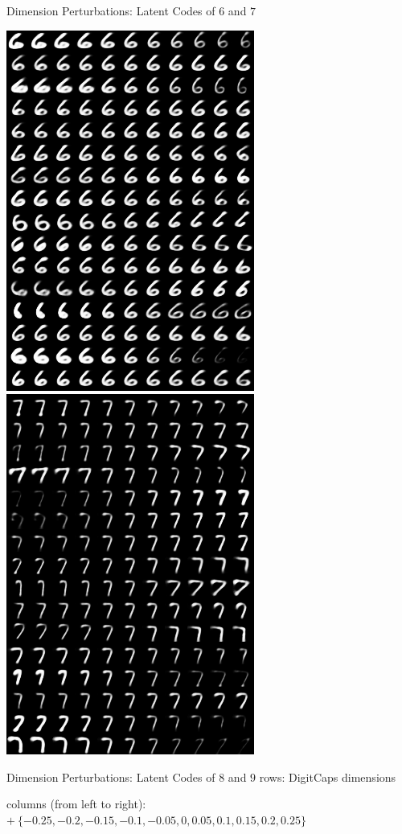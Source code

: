 \documentclass{beamer}
\begin{document}
{\begin{frame}{Dimension Perturbations: Latent Codes of $6$ and $7$}
      \begin{center}
        \includegraphics[width=.4\textwidth]{../img/recons-capsnet-keras/manipulate-6.png}
        \includegraphics[width=.4\textwidth]{../img/recons-capsnet-keras/manipulate-7.png}
      \end{center}
    \end{frame}

    \begin{frame}{Dimension Perturbations: Latent Codes of $8$ and $9$}
      \tiny
      rows: DigitCaps dimensions

      columns (from left to right): $+ \  \{ -0.25, -0.2, -0.15, -0.1, -0.05, 0, 0.05, 0.1, 0.15, 0.2, 0.25 \}$


\end{frame}}
\end{document}
